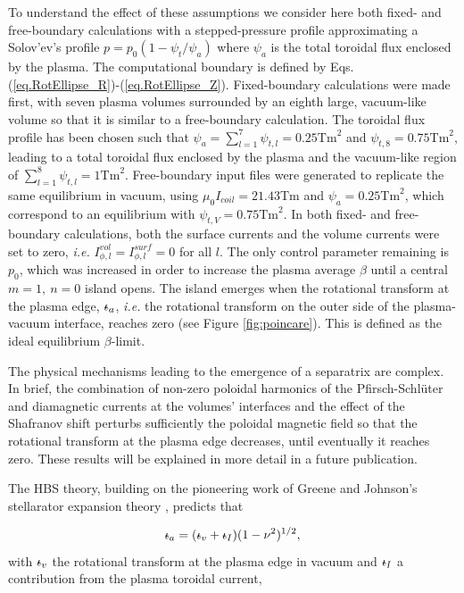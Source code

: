 \documentclass[my_thesis.tex]{subfiles}
\begin{document}
To understand the effect of these assumptions we consider here both fixed- and free-boundary calculations with a stepped-pressure profile approximating a Solov'ev's profile $p = p_0(1-\psi_t / \psi_a)$ where $\psi_a$ is the total toroidal flux enclosed by the plasma. The computational boundary is defined by Eqs.(\ref{eq.RotEllipse_R})-(\ref{eq.RotEllipse_Z}). Fixed-boundary calculations were made first, with seven plasma volumes surrounded by an eighth large, vacuum-like volume so that it is similar to a free-boundary calculation. The toroidal flux profile has been chosen such that $\psi_a=\sum_{l=1}^7\psi_{t,l}=0.25\text{Tm}^2$ and $\psi_{t,8} = 0.75\text{Tm}^2$, leading to a total toroidal flux enclosed by the plasma and the vacuum-like region of $\sum_{l=1}^8\psi_{t,l} = 1\text{Tm}^2$. Free-boundary input files were generated to replicate the same equilibrium in vacuum, using $\mu_0I_{coil}=21.43$Tm and $\psi_a=0.25\text{Tm}^2$, which correspond to an equilibrium with $\psi_{t,V}=0.75\text{Tm}^2$. In both fixed- and free-boundary calculations, both the surface currents and the volume currents were set to zero, \textit{i.e.} $I_{\phi,l}^{vol} = I_{\phi,l}^{surf} = 0$ for all $l$. The only control parameter remaining is $p_0$, which was increased in order to increase the plasma average $\beta$ until a central $m=1,\ n=0$ island opens. The island emerges when the rotational transform at the plasma edge, $\text{$\iota\!\!$-}_a$, \textit{i.e.} the rotational transform on the outer side of the plasma-vacuum interface, reaches zero (see Figure \ref{fig:poincare}). This is defined as the ideal equilibrium $\beta$-limit. 

The physical mechanisms leading to the emergence of a separatrix are complex. In brief, the combination of non-zero poloidal harmonics of the Pfirsch-Schlüter and diamagnetic currents at the volumes' interfaces and the effect of the Shafranov shift perturbs sufficiently the poloidal magnetic field so that the rotational transform at the plasma edge decreases, until eventually it reaches zero. These results will be explained in more detail in a future publication.


The \ac{HBS} theory, building on the pioneering work of Greene and Johnson's stellarator expansion theory \citep{greene_determination_1961}, predicts that

\begin{equation}
	\text{$\iota\!\!$-}_a = (\text{$\iota\!\!$-}_v + \text{$\iota\!\!$-}_I)(1-\nu^2)^{1/2},\label{eq.HBS_1}
\end{equation}
with $\text{$\iota\!\!$-}_v$ the rotational transform at the plasma edge in vacuum and $\text{$\iota\!\!$-}_I$ a contribution from the plasma toroidal current,
\end{document}
